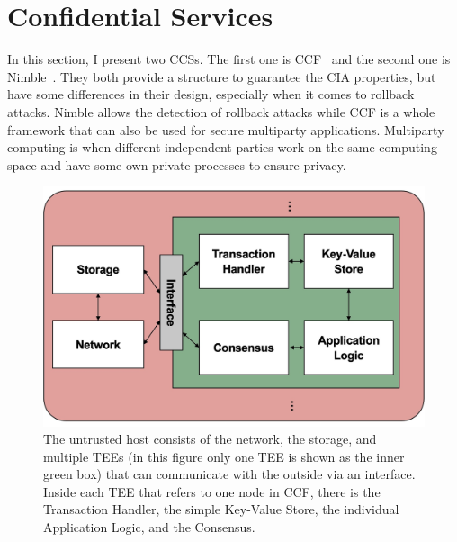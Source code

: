 \section{Confidential Services}
In this section, I present two CCSs. The first one is CCF~\cite{Howard} and the second one is Nimble~\cite{Nimble}. They both provide a structure to guarantee the CIA properties, but have some differences in their design, especially when it comes to rollback attacks. Nimble allows the detection of rollback attacks while CCF is a whole framework that can also be used for secure multiparty applications. Multiparty computing is when different independent parties work on the same computing space and have some own private processes to ensure privacy.

 \begin{figure}[t]
	\includegraphics[scale=0.14]{pictures/ccf}
	\caption{The untrusted host consists of the network,  the storage, and multiple TEEs (in this figure only one TEE is shown as the inner green box) that can communicate with the outside via an interface. Inside each TEE that refers to one node in CCF, there is the Transaction Handler, the simple Key-Value Store, the individual Application Logic, and the Consensus.}
	\label{ccf}
\end{figure}

